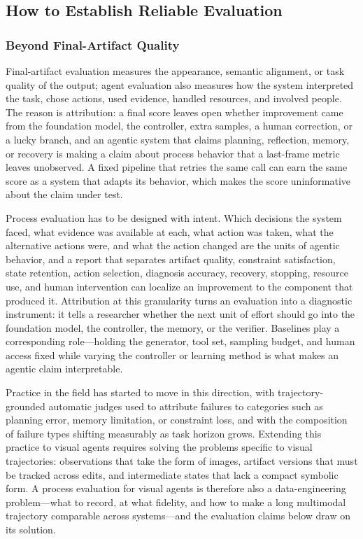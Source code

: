 \subsection{How to Establish Reliable Evaluation}

\subsubsection{Beyond Final-Artifact Quality}

Final-artifact evaluation measures the appearance, semantic alignment, or task quality of the output; agent evaluation also measures how the system interpreted the task, chose actions, used evidence, handled resources, and involved people. The reason is attribution: a final score leaves open whether improvement came from the foundation model, the controller, extra samples, a human correction, or a lucky branch, and an agentic system that claims planning, reflection, memory, or recovery is making a claim about process behavior that a last-frame metric leaves unobserved. A fixed pipeline that retries the same call can earn the same score as a system that adapts its behavior, which makes the score uninformative about the claim under test.

Process evaluation has to be designed with intent. Which decisions the system faced, what evidence was available at each, what action was taken, what the alternative actions were, and what the action changed are the units of agentic behavior, and a report that separates artifact quality, constraint satisfaction, state retention, action selection, diagnosis accuracy, recovery, stopping, resource use, and human intervention can localize an improvement to the component that produced it. Attribution at this granularity turns an evaluation into a diagnostic instrument: it tells a researcher whether the next unit of effort should go into the foundation model, the controller, the memory, or the verifier. Baselines play a corresponding role---holding the generator, tool set, sampling budget, and human access fixed while varying the controller or learning method is what makes an agentic claim interpretable.

Practice in the field has started to move in this direction, with trajectory-grounded automatic judges used to attribute failures to categories such as planning error, memory limitation, or constraint loss, and with the composition of failure types shifting measurably as task horizon grows. Extending this practice to visual agents requires solving the problems specific to visual trajectories: observations that take the form of images, artifact versions that must be tracked across edits, and intermediate states that lack a compact symbolic form. A process evaluation for visual agents is therefore also a data-engineering problem---what to record, at what fidelity, and how to make a long multimodal trajectory comparable across systems---and the evaluation claims below draw on its solution.

